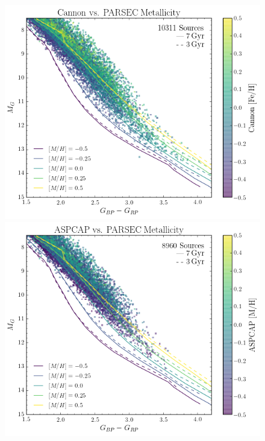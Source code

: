 \documentclass[twocolumn]{aastex62}
\newcommand{\cannon}{\textsl{Cannon}}
\newcommand{\gaia}{\textsl{Gaia}}
\newcommand{\feh}{[{\mathrm{Fe}/\mathrm{H}}]}
\begin{document}

\begin{figure}
	\includegraphics[width=\linewidth]{figures/cannon_vs_parsec.png}
	\includegraphics[width=\linewidth]{figures/aspcap_vs_parsec1.png}

\end{figure}
\end{document}

